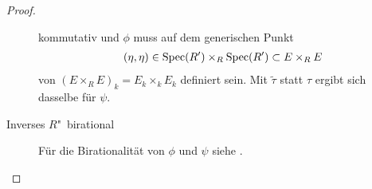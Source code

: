 \begin{Lemma}
\begin{proof}
\begin{description}
\begin{center}
      \end{center}
      kommutativ und $\phi$ muss auf dem generischen Punkt
      \begin{gather*}
        (\eta,\eta)\in\operatorname{Spec}(R')\times_R\operatorname{Spec}(R')\subset E\times_R E  
      \end{gather*}
      von $(E\times_R E)_k=E_k\times_k E_k$ definiert sein.
      Mit $\tilde\tau$ statt $\tau$ ergibt sich dasselbe für $\psi$.
      
    \item[Inverses $R$"~birational]
      Für die Birationalität von $\phi$ und $\psi$ siehe
      \cite[Propsition~IV.6.10]{silverman2}.
      \qedhere
    \end{description}
  \end{proof}
\end{Lemma}

